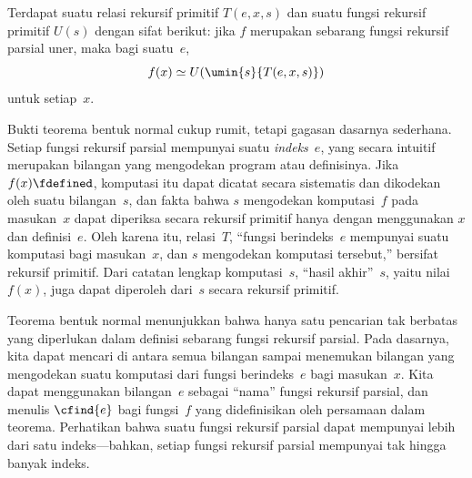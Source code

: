 \documentclass[../../../include/open-logic-section]{subfiles}
\begin{document}

\begin{thm}
Terdapat suatu relasi rekursif primitif $T(e,x,s)$ dan suatu fungsi rekursif
primitif $U(s)$ dengan sifat berikut: jika $f$ merupakan sebarang fungsi
rekursif parsial uner, maka bagi suatu~$e$,
\[
f(x) \simeq U(\umin{s}{T(e, x, s)})
\]
untuk setiap~$x$.
\end{thm}

\begin{explain}
Bukti teorema bentuk normal cukup rumit, tetapi gagasan dasarnya sederhana.
Setiap fungsi rekursif parsial mempunyai suatu \emph{indeks}~$e$, yang secara
intuitif merupakan bilangan yang mengodekan program atau definisinya. Jika
$f(x)\fdefined$, komputasi itu dapat dicatat secara sistematis dan dikodekan
oleh suatu bilangan~$s$, dan fakta bahwa $s$ mengodekan komputasi~$f$ pada
masukan~$x$ dapat diperiksa secara rekursif primitif hanya dengan menggunakan
$x$ dan definisi~$e$. Oleh karena itu, relasi~$T$, ``fungsi berindeks~$e$
mempunyai suatu komputasi bagi masukan~$x$, dan $s$ mengodekan komputasi
tersebut,'' bersifat rekursif primitif. Dari catatan lengkap komputasi~$s$,
``hasil akhir''~$s$, yaitu nilai~$f(x)$, juga dapat diperoleh dari~$s$ secara
rekursif primitif.

Teorema bentuk normal menunjukkan bahwa hanya satu pencarian tak berbatas yang
diperlukan dalam definisi sebarang fungsi rekursif parsial. Pada dasarnya,
kita dapat mencari di antara semua bilangan sampai menemukan bilangan yang
mengodekan suatu komputasi dari fungsi berindeks~$e$ bagi masukan~$x$. Kita
dapat menggunakan bilangan~$e$ sebagai ``nama'' fungsi rekursif parsial, dan
menulis $\cfind{e}$ bagi fungsi~$f$ yang didefinisikan oleh persamaan dalam
teorema. Perhatikan bahwa suatu fungsi rekursif parsial dapat mempunyai lebih
dari satu indeks---bahkan, setiap fungsi rekursif parsial mempunyai tak hingga
banyak indeks.
\end{explain}
\end{document}
